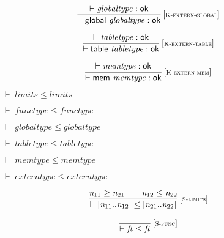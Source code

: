 $$
\begin{array}{@{}c@{}}\displaystyle
\frac{
{ \vdash }\;{\mathit{globaltype}} : \mathsf{ok}
}{
{ \vdash }\;\mathsf{global}~{\mathit{globaltype}} : \mathsf{ok}
} \, {[\textsc{\scriptsize K{-}extern{-}global}]}
\qquad
\end{array}
$$

$$
\begin{array}{@{}c@{}}\displaystyle
\frac{
{ \vdash }\;{\mathit{tabletype}} : \mathsf{ok}
}{
{ \vdash }\;\mathsf{table}~{\mathit{tabletype}} : \mathsf{ok}
} \, {[\textsc{\scriptsize K{-}extern{-}table}]}
\qquad
\end{array}
$$

$$
\begin{array}{@{}c@{}}\displaystyle
\frac{
{ \vdash }\;{\mathit{memtype}} : \mathsf{ok}
}{
{ \vdash }\;\mathsf{mem}~{\mathit{memtype}} : \mathsf{ok}
} \, {[\textsc{\scriptsize K{-}extern{-}mem}]}
\qquad
\end{array}
$$

\vspace{1ex}

\vspace{1ex}

$\boxed{{ \vdash }\;{\mathit{limits}} \leq {\mathit{limits}}}$

$\boxed{{ \vdash }\;{\mathit{functype}} \leq {\mathit{functype}}}$

$\boxed{{ \vdash }\;{\mathit{globaltype}} \leq {\mathit{globaltype}}}$

$\boxed{{ \vdash }\;{\mathit{tabletype}} \leq {\mathit{tabletype}}}$

$\boxed{{ \vdash }\;{\mathit{memtype}} \leq {\mathit{memtype}}}$

$\boxed{{ \vdash }\;{\mathit{externtype}} \leq {\mathit{externtype}}}$

\vspace{1ex}

$$
\begin{array}{@{}c@{}}\displaystyle
\frac{
{\mathit{n}}_{{11}} \geq {\mathit{n}}_{{21}}
 \qquad
{\mathit{n}}_{{12}} \leq {\mathit{n}}_{{22}}
}{
{ \vdash }\;{}[{\mathit{n}}_{{11}} .. {\mathit{n}}_{{12}}] \leq {}[{\mathit{n}}_{{21}} .. {\mathit{n}}_{{22}}]
} \, {[\textsc{\scriptsize S{-}limits}]}
\qquad
\end{array}
$$

$$
\begin{array}{@{}c@{}}\displaystyle
\frac{
}{
{ \vdash }\;{\mathit{ft}} \leq {\mathit{ft}}
} \, {[\textsc{\scriptsize S{-}func}]}
\qquad
\end{array}
$$

